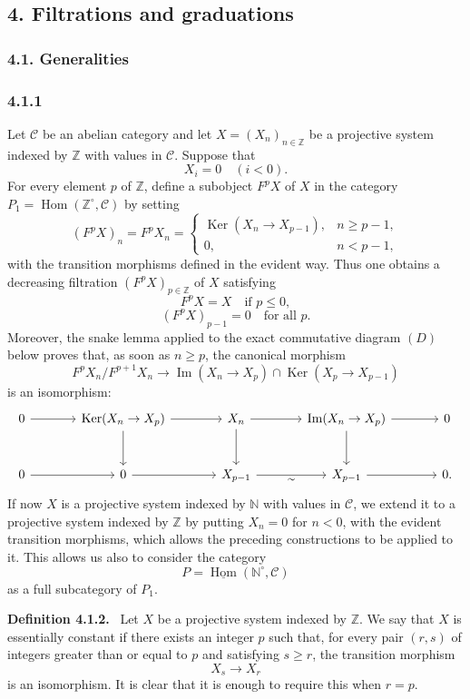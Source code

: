 \documentclass[11pt]{article}
\providecommand{\uHom}{\underline{\Hom}}
\providecommand{\ZZ}{\mathbb{Z}}
\providecommand{\NN}{\mathbb{N}}
\newenvironment{statement}[1]{\par\medskip\noindent\textbf{#1.}\ }{\par\medskip}
\DeclareMathOperator{\Hom}{Hom}
\providecommand{\Ker}{\operatorname{Ker}}
\providecommand{\Hom}{\operatorname{Hom}}
\providecommand{\NN}{\mathbb N}
\providecommand{\cC}{\mathcal C}
\providecommand{\Im}{\operatorname{Im}}
\providecommand{\Ker}{\operatorname{Ker}}
\renewcommand{\Im}{\operatorname{Im}}
\providecommand{\Ker}{\operatorname{Ker}}
\providecommand{\Im}{\operatorname{Im}}
\providecommand{\cC}{\mathcal C}
\providecommand{\Hom}{\operatorname{Hom}}
\begin{document}
\subsection*{4. Filtrations and graduations}
\subsubsection*{4.1. Generalities}
\subsubsection*{4.1.1}
Let $\cC$ be an abelian category and let $X=(X_n)_{n\in\ZZ}$ be a projective system indexed by $\ZZ$ with values in $\cC$. Suppose that
\[
X_i=0\quad(i<0).
\]
For every element $p$ of $\ZZ$, define a subobject $F^pX$ of $X$ in the category $P_1=\Hom(\ZZ^\circ,\cC)$ by setting
\[
(F^pX)_n=F^pX_n=
\begin{cases}
\Ker(X_n\to X_{p-1}),& n\ge p-1,\\
0,& n<p-1,
\end{cases}
\]
with the transition morphisms defined in the evident way. Thus one obtains a decreasing filtration $(F^pX)_{p\in\ZZ}$ of $X$ satisfying
\begin{equation}\tag{a}
F^pX=X\quad\text{if }p\le0,
\end{equation}
\begin{equation}\tag{b}
(F^pX)_{p-1}=0\quad\text{for all }p.
\end{equation}
Moreover, the snake lemma applied to the exact commutative diagram $(D)$ below proves that, as soon as $n\ge p$, the canonical morphism
\[
F^pX_n/F^{p+1}X_n\longrightarrow \Im(X_n\to X_p)\cap\Ker(X_p\to X_{p-1})
\]
is an isomorphism:
\[
\begin{tikzcd}[column sep=large,row sep=large]
0 \arrow[r] & \Ker(X_n\to X_p) \arrow[r] \arrow[d] & X_n \arrow[r] \arrow[d] & \Im(X_n\to X_p) \arrow[r] \arrow[d] & 0\\
0 \arrow[r] & 0 \arrow[r] & X_{p-1} \arrow[r,"\sim"'] & X_{p-1} \arrow[r] & 0 .
\end{tikzcd}
\]
If now $X$ is a projective system indexed by $\NN$ with values in $\cC$, we extend it to a projective system indexed by $\ZZ$ by putting $X_n=0$ for $n<0$, with the evident transition morphisms, which allows the preceding constructions to be applied to it. This allows us also to consider the category
\[
P=\uHom(\NN^\circ,\cC)
\]
as a full subcategory of $P_1$.

\begin{statement}{Definition 4.1.2}
Let $X$ be a projective system indexed by $\ZZ$. We say that $X$ is essentially constant if there exists an integer $p$ such that, for every pair $(r,s)$ of integers greater than or equal to $p$ and satisfying $s\ge r$, the transition morphism
\[
X_s\longrightarrow X_r
\]
is an isomorphism. It is clear that it is enough to require this when $r=p$.
\end{statement}
\end{document}
